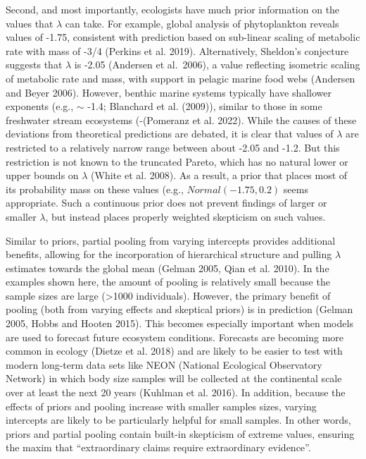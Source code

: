 \documentclass[
  12pt,
]{article}
\numberwithin{equation}
\begin{document}
Second, and most importantly, ecologists have much prior information on
the values that \(\lambda\) can take. For example, global analysis of
phytoplankton reveals values of -1.75, consistent with prediction based
on sub-linear scaling of metabolic rate with mass of -3/4 (Perkins et
al. 2019). Alternatively, Sheldon's conjecture suggests that \(\lambda\)
is -2.05 (Andersen et al.~2006), a value reflecting isometric scaling of
metabolic rate and mass, with support in pelagic marine food webs
(Andersen and Beyer 2006). However, benthic marine systems typically
have shallower exponents (e.g., \(\sim\) -1.4; Blanchard et al. (2009)),
similar to those in some freshwater stream ecosystems (-(Pomeranz et al.
2022). While the causes of these deviations from theoretical predictions
are debated, it is clear that values of \(\lambda\) are restricted to a
relatively narrow range between about -2.05 and -1.2. But this
restriction is not known to the truncated Pareto, which has no natural
lower or upper bounds on \(\lambda\) (White et al. 2008). As a result, a
prior that places most of its probability mass on these values (e.g.,
\(Normal(-1.75, 0.2)\) seems appropriate. Such a continuous prior does
not prevent findings of larger or smaller \(\lambda\), but instead
places properly weighted skepticism on such values.

Similar to priors, partial pooling from varying intercepts provides
additional benefits, allowing for the incorporation of hierarchical
structure and pulling \(\lambda\) estimates towards the global mean
(Gelman 2005, Qian et al. 2010). In the examples shown here, the amount
of pooling is relatively small because the sample sizes are large
(\textgreater1000 individuals). However, the primary benefit of pooling
(both from varying effects and skeptical priors) is in prediction
(Gelman 2005, Hobbs and Hooten 2015). This becomes especially important
when models are used to forecast future ecosystem conditions. Forecasts
are becoming more common in ecology (Dietze et al. 2018) and are likely
to be easier to test with modern long-term data sets like NEON (National
Ecological Observatory Network) in which body size samples will be
collected at the continental scale over at least the next 20 years
(Kuhlman et al. 2016). In addition, because the effects of priors and
pooling increase with smaller samples sizes, varying intercepts are
likely to be particularly helpful for small samples. In other words,
priors and partial pooling contain built-in skepticism of extreme
values, ensuring the maxim that ``extraordinary claims require
extraordinary evidence''.
\end{document}
